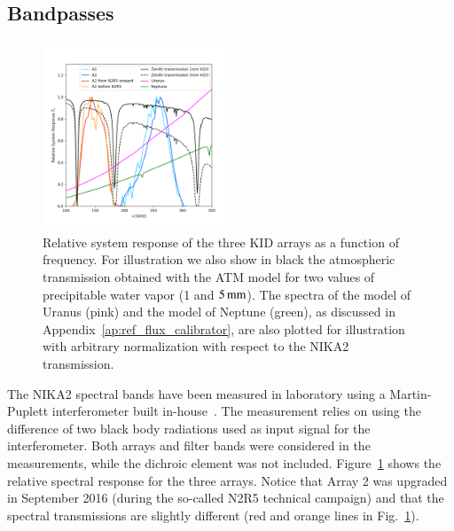 \subsection{Bandpasses}
\label{se:instru_bandpass}

\begin{figure}[ht!] %
\begin{center}
\includegraphics[clip,trim={0, 1cm, 0, 2cm},width=0.5\textwidth]{Figures/bandpasses_nika2_colorsok.png}
\caption[NIKA2 transmission]{Relative system response of the three KID
  arrays as a
  function of frequency. For illustration we also show in black
  the atmospheric transmission obtained with the ATM model \citep{ATM,
    Pardo2001} for two values of precipitable water vapor (1 and
  $5\,\rm{mm}$).
  The spectra of the model of Uranus (pink) and the model of
  Neptune
  (green), as discussed in Appendix~\ref{ap:ref_flux_calibrator}, are
  also plotted for illustration with arbitrary
  normalization with respect to the NIKA2 transmission.} 
 \label{spectralband1}
\end{center}
\end{figure}

The NIKA2 spectral bands have been measured in laboratory using a
Martin-Puplett interferometer built in-house~\citep{Durand2007_these}.
The measurement relies on using the difference of two black
body radiations used as input signal for the interferometer. 
{\lp Both arrays and filter bands were considered in the
measurements, while the dichroic element was not included.}
Figure~\ref{spectralband1} shows the relative spectral response for
the three arrays. Notice that Array 2 was
upgraded in September 2016 (during the so-called N2R5 technical campaign) and that
the spectral transmissions are slightly different (red and orange lines in
Fig.~\ref{spectralband1}).


